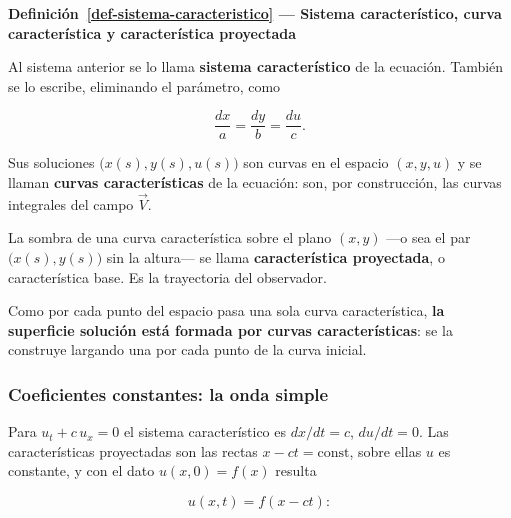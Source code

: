 \documentclass[
  spanish,
  a4paper,
]{scrbook}
\theoremstyle{definition}
\theoremstyle{plain}
\theoremstyle{definition}
\theoremstyle{plain}
\theoremstyle{definition}
\theoremstyle{remark}
\begin{document}
\begin{tcolorbox}[enhanced jigsaw, arc=.35mm, bottomrule=.15mm, breakable, colback=white, colframe=quarto-callout-note-color-frame, left=2mm, leftrule=.75mm, opacityback=0, rightrule=.15mm, toprule=.15mm]
\begin{minipage}[t]{5.5mm}
\textcolor{quarto-callout-note-color}{\faInfo}
\end{minipage}%
\begin{minipage}[t]{\textwidth - 5.5mm}

\vspace{-3mm}\textbf{Definición~\ref{def-sistema-caracteristico} --- Sistema característico,
curva característica y característica proyectada}\vspace{3mm}

Al sistema anterior se lo llama \textbf{sistema característico} de la
ecuación. También se lo escribe, eliminando el parámetro, como

\[
\frac{dx}{a} = \frac{dy}{b} = \frac{du}{c} .
\]

Sus soluciones \(\big(x(s),y(s),u(s)\big)\) son curvas en el espacio
\((x,y,u)\) y se llaman \textbf{curvas características} de la ecuación:
son, por construcción, las curvas integrales del campo \(\vec V\).

La sombra de una curva característica sobre el plano \((x,y)\) ---o sea
el par \(\big(x(s),y(s)\big)\) sin la altura--- se llama
\textbf{característica proyectada}, o característica base. Es la
trayectoria del observador.

\end{minipage}%
\end{tcolorbox}

Como por cada punto del espacio pasa una sola curva característica,
\textbf{la superficie solución está formada por curvas características}:
se la construye largando una por cada punto de la curva inicial.

\subsubsection{Coeficientes constantes: la onda
simple}\label{coeficientes-constantes-la-onda-simple}

Para \(u_t + c\,u_x = 0\) el sistema característico es \(dx/dt = c\),
\(du/dt = 0\). Las características proyectadas son las rectas
\(x - ct = \text{const}\), sobre ellas \(u\) es constante, y con el dato
\(u(x,0)=f(x)\) resulta

\[
u(x,t) = f(x - ct) :
\]
\end{document}
